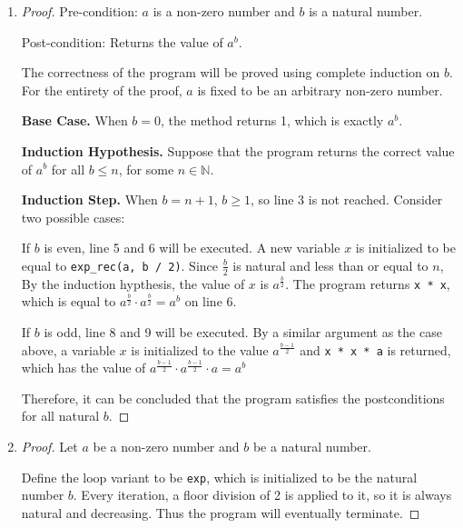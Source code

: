 \documentclass[11pt]{article}
\begin{document}
    \begin{enumerate}[label=(\alph*)]
        \item 
        \begin{proof}
            Pre-condition: \(a\) is a non-zero number and \(b\) is a natural number.
            
            Post-condition: Returns the value of \(a^b\).

            The correctness of the program will be proved using complete induction on \(b\). For the entirety of the proof, \(a\) is fixed to be an arbitrary non-zero number.

            \textbf{Base Case.} When \(b=0\), the method returns 1, which is exactly \(a^b\).

            \textbf{Induction Hypothesis.} Suppose that the program returns the correct value of \(a^b\) for all \(b \leq n\), for some \(n \in \mathbb{N}\).

            \textbf{Induction Step.} When \(b = n+1\), \(b \geq 1\), so line 3 is not reached. Consider two possible cases:
            
            If \(b\) is even, line 5 and 6 will be executed. A new variable \(x\) is initialized to be equal to \verb|exp_rec(a, b / 2)|. Since \(\frac{b}{2}\) is natural and less than or equal to \(n\), By the induction hypthesis, the value of \(x\) is \(a^{\frac{b}{2}}\). The program returns \verb|x * x|, which is equal to \(a^{\frac{b}{2}} \cdot a^{\frac{b}{2}} = a^b\) on line 6. 

            If \(b\) is odd, line 8 and 9 will be executed. By a similar argument as the case above, a variable \(x\) is initialized to the value \(a^{\frac{b-1}{2}}\) and \verb|x * x * a| is returned, which has the value of \(a^{\frac{b-1}{2}} \cdot a^{\frac{b-1}{2}} \cdot a = a^b\)

            Therefore, it can be concluded that the program satisfies the postconditions for all natural \(b\).

        \end{proof}

        \item 
        \begin{proof}
            Let \(a\) be a non-zero number and \(b\) be a natural number. 
            
            Define the loop variant to be \verb|exp|, which is initialized to be the natural number \(b\). Every iteration, a floor division of 2 is applied to it, so it is always natural and decreasing. Thus the program will eventually terminate.
            

\end{proof}
\end{enumerate}
\end{document}
